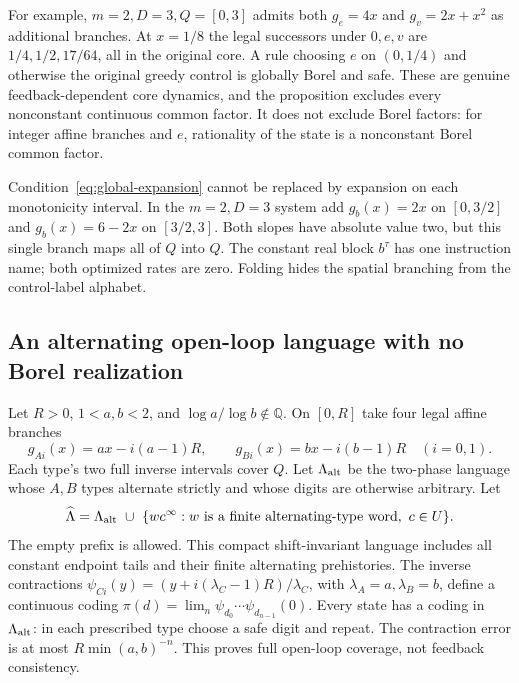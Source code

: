 \documentclass[11pt,reqno]{amsart}
\numberwithin{equation}{section}
\theoremstyle{definition}
\begin{document}
For example, $m=2,D=3,Q=[0,3]$ admits both $g_e=4x$ and
$g_v=2x+x^2$ as additional branches. At $x=1/8$ the legal
successors under $0,e,v$ are $1/4,1/2,17/64$, all in the original
core. A rule choosing $e$ on $(0,1/4)$ and otherwise the original
greedy control is globally Borel and safe. These are genuine
feedback-dependent core dynamics, and the proposition excludes every
nonconstant continuous common factor. It does not exclude Borel
factors: for integer affine branches and $e$, rationality of the
state is a nonconstant Borel common factor.

Condition~\eqref{eq:global-expansion} cannot be replaced by expansion
on each monotonicity interval. In the $m=2,D=3$ system add
$g_b(x)=2x$ on $[0,3/2]$ and $g_b(x)=6-2x$ on $[3/2,3]$.
Both slopes have absolute value two, but this single branch maps
all of $Q$ into $Q$. The constant real block $b^\tau$ has one
instruction name; both optimized rates are zero. Folding hides
the spatial branching from the control-label alphabet.

\subsection{An alternating open-loop language with no Borel realization}
Let $R>0$, $1<a,b<2$, and $\log a/\log b\notin\mathbb Q$.
On $[0,R]$ take four legal affine branches
\[
 g_{Ai}(x)=ax-i(a-1)R,\qquad
 g_{Bi}(x)=bx-i(b-1)R\quad(i=0,1).
\]
Each type's two full inverse intervals cover $Q$. Let
$\Lambda_{\rm alt}$ be the two-phase language whose $A,B$ types
alternate strictly and whose digits are otherwise arbitrary. Let
\[
 \widehat\Lambda=\Lambda_{\rm alt}\ \cup\
 \{w c^\infty:w\text{ is a finite alternating-type word},\ c\in U\}.
\]
The empty prefix is allowed. This compact shift-invariant language
includes all constant endpoint tails and their finite alternating
prehistories. The inverse contractions
$\psi_{Ci}(y)=(y+i(\lambda_C-1)R)/\lambda_C$, with
$\lambda_A=a,\lambda_B=b$, define a continuous coding
$\pi(d)=\lim_n\psi_{d_0}\cdots\psi_{d_{n-1}}(0)$.
Every state has a coding in $\Lambda_{\rm alt}$: in each prescribed
type choose a safe digit and repeat. The contraction error is at
most $R\min(a,b)^{-n}$. This proves full open-loop coverage, not
feedback consistency.
\end{document}
